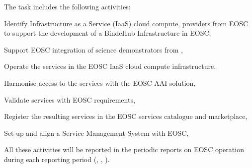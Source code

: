 \begin{task}[
  title=Integration with EOSC,
  id=eosc,
  lead=EGI,
  PM=24,
  wphases={12-48!.7},
  partners={SRL,WTT,XFEL}
]
  The task includes the following activities:
  \begin{compactitem}
  \item Identify Infrastructure as a Service (IaaS) cloud compute,
    providers from EOSC to support the development of a BindeHub
    Infrastructure in EOSC,
  \item Support EOSC integration of science demonstrators from ,
  \item Operate the services in the EOSC IaaS cloud compute infrastructure,
  \item Harmonise access to the \TheProject services with the EOSC AAI solution,
  \item Validate services with EOSC requirements,
  \item Register the resulting services in the EOSC services catalogue and marketplace,
  \item Set-up and align a Service Management System with EOSC,
  \end{compactitem}

   All these activities will be reported in the periodic reports on EOSC operation
   during each reporting period (, , ).
\end{task}
